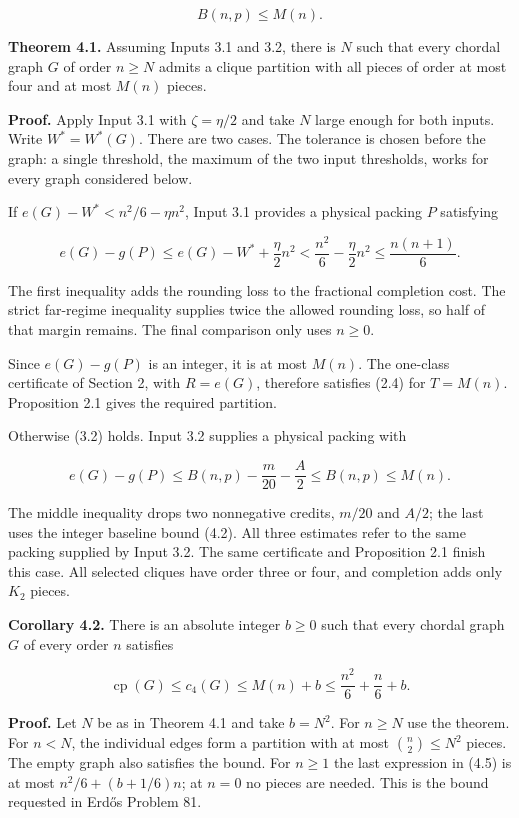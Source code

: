 \documentclass[english,11pt,a4paper]{article}
\begin{document}
\[
B(n,p)\le M(n).
\tag{4.2}
\]

\textbf{Theorem 4.1.} Assuming Inputs 3.1 and 3.2, there is \(N\) such
that every chordal graph \(G\) of order \(n\ge N\) admits a clique
partition with all pieces of order at most four and at most \(M(n)\)
pieces.

\textbf{Proof.} Apply Input 3.1 with \(\zeta=\eta/2\) and take \(N\)
large enough for both inputs. Write \(W^*=W^*(G)\). There are two cases.
The tolerance is chosen before the graph: a single threshold, the
maximum of the two input thresholds, works for every graph considered
below.

If \(e(G)-W^*<n^2/6-\eta n^2\), Input 3.1 provides a physical packing
\(P\) satisfying

\[
e(G)-g(P)
\le e(G)-W^*+\frac\eta2n^2
<\frac{n^2}{6}-\frac\eta2n^2
\le\frac{n(n+1)}6.
\tag{4.3}
\]

The first inequality adds the rounding loss to the fractional completion
cost. The strict far-regime inequality supplies twice the allowed
rounding loss, so half of that margin remains. The final comparison only
uses \(n\ge0\).

Since \(e(G)-g(P)\) is an integer, it is at most \(M(n)\). The one-class
certificate of Section 2, with \(R=e(G)\), therefore satisfies (2.4) for
\(T=M(n)\). Proposition 2.1 gives the required partition.

Otherwise (3.2) holds. Input 3.2 supplies a physical packing with

\[
e(G)-g(P)\le B(n,p)-\frac m{20}-\frac A2
\le B(n,p)\le M(n).
\tag{4.4}
\]

The middle inequality drops two nonnegative credits, \(m/20\) and
\(A/2\); the last uses the integer baseline bound (4.2). All three
estimates refer to the same packing supplied by Input 3.2. The same
certificate and Proposition 2.1 finish this case. All selected cliques
have order three or four, and completion adds only \(K_2\) pieces.

\textbf{Corollary 4.2.} There is an absolute integer \(b\ge0\) such that
every chordal graph \(G\) of every order \(n\) satisfies

\[
\operatorname{cp}(G)\le c_4(G)\le M(n)+b
\le\frac{n^2}{6}+\frac n6+b.
\tag{4.5}
\]

\textbf{Proof.} Let \(N\) be as in Theorem 4.1 and take \(b=N^2\). For
\(n\ge N\) use the theorem. For \(n<N\), the individual edges form a
partition with at most \(\binom n2\le N^2\) pieces. The empty graph also
satisfies the bound. For \(n\ge1\) the last expression in (4.5) is at
most \(n^2/6+(b+1/6)n\); at \(n=0\) no pieces are needed. This is the
bound requested in Erdős Problem 81.
\end{document}
